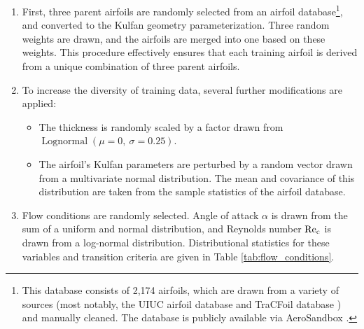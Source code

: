 \documentclass[journal]{new-aiaa}
\begin{document}
\begin{enumerate}
    \item First, three parent airfoils are randomly selected from an airfoil database\footnote{This database consists of 2,174 airfoils, which are drawn from a variety of sources (most notably, the UIUC airfoil database \cite{uiuc_airfoil_database} and TraCFoil database \cite{etiembleTraCFoilFreePack2023}) and manually cleaned. The database is publicly available via AeroSandbox \cite{sharpeAeroSandboxDifferentiableFramework2021}.}, and converted to the Kulfan geometry parameterization. Three random weights are drawn, and the airfoils are merged into one based on these weights. This procedure effectively ensures that each training airfoil is derived from a unique combination of three parent airfoils.
    \item To increase the diversity of training data, several further modifications are applied:
          \begin{itemize}
              \item The thickness is randomly scaled by a factor drawn from $\operatorname{Lognormal}(\mu=0,\ \sigma=0.25)$.
              \item The airfoil's Kulfan parameters are perturbed by a random vector drawn from a multivariate normal distribution. The mean and covariance of this distribution are taken from the sample statistics of the airfoil database.
          \end{itemize}
    \item Flow conditions are randomly selected. Angle of attack $\alpha$ is drawn from the sum of a uniform and normal distribution, and Reynolds number $\rm Re_c$ is drawn from a log-normal distribution. Distributional statistics for these variables and transition criteria are given in Table \ref{tab:flow_conditions}.
\end{enumerate}
\end{document}
